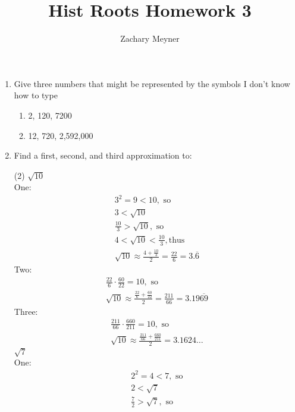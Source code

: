 \documentclass[12pt]{article}
\title{\large Hist Roots Homework 3}
\author{\large Zachary Meyner}
\date{}
\begin{document}
\maketitle

\begin{enumerate}
    \item Give three numbers that might be represented by the symbols I don't know how to type
        \begin{enumerate}
            \item 2, 120, 7200
            \item 12, 720, 2,592,000
        \end{enumerate}
    \item Find a first, second, and third approximation to:

            \begin{tasks} (2)
            \task$\sqrt{10}$\\
            One:
            \begin{gather*}
                3^2 = 9 < 10, \text{ so} \\
                3 < \sqrt{10} \\
                \frac{10}{3} > \sqrt{10}, \text{ so} \\
                4 < \sqrt{10} < \frac{10}{3}, \text{thus} \\
                \sqrt{10} \approx \frac{4+\frac{10}{3}}{2}=\frac{22}{6}=3.\overline{6}
            \end{gather*}
            Two:
            \begin{gather*}
                \frac{22}{6}\cdot\frac{60}{22}=10, \text{ so} \\
                \sqrt{10} \approx \frac{\frac{22}{6}+\frac{60}{22}}{2}=\frac{211}{66}=3.19\overline{69}
            \end{gather*}
            Three:
            \begin{gather*}
                \frac{211}{66}\cdot\frac{660}{211}=10, \text{ so} \\
                \sqrt{10} \approx \frac{\frac{211}{66}+\frac{660}{211}}{2}=3.1624\dots
            \end{gather*}
            \task$\sqrt{7}$\\
            One:
            \begin{gather*}
                2^2=4 < 7, \text{ so} \\
                2 < \sqrt{7} \\
                \frac{7}{2} > \sqrt{7}, \text{ so} \\

\end{gather*}
\end{tasks}
\end{enumerate}
\end{document}
